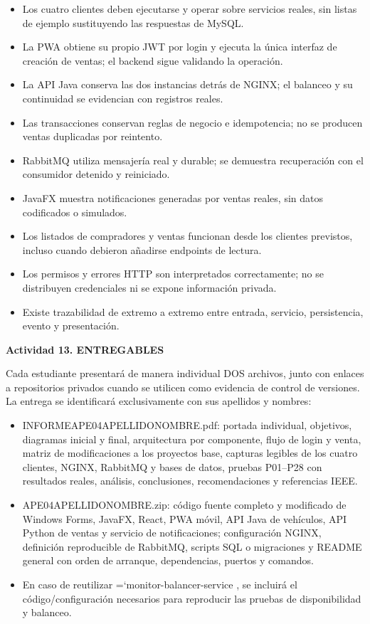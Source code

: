\documentclass[11pt,a4paper]{article}
\renewcommand{\_}{\oldunderscore\allowbreak}
\DeclareRobustCommand{\texttt}[1]{%
  {\upshape\ttfamily\fontsize{9}{10.8}\selectfont\hyphenchar\font=`\-\relax #1}%
}
\begin{document}
\begin{itemize}[leftmargin=*,itemsep=2pt,topsep=2pt]
  \item Los cuatro clientes deben ejecutarse y operar sobre servicios reales, sin listas de ejemplo sustituyendo las respuestas de MySQL.
  \item La PWA obtiene su propio JWT por login y ejecuta la única interfaz de creación de ventas; el backend sigue validando la operación.
  \item La API Java conserva las dos instancias detrás de NGINX; el balanceo y su continuidad se evidencian con registros reales.
  \item Las transacciones conservan reglas de negocio e idempotencia; no se producen ventas duplicadas por reintento.
  \item RabbitMQ utiliza mensajería real y durable; se demuestra recuperación con el consumidor detenido y reiniciado.
  \item JavaFX muestra notificaciones generadas por ventas reales, sin datos codificados o simulados.
  \item Los listados de compradores y ventas funcionan desde los clientes previstos, incluso cuando debieron añadirse endpoints de lectura.
  \item Los permisos y errores HTTP son interpretados correctamente; no se distribuyen credenciales ni se expone información privada.
  \item Existe trazabilidad de extremo a extremo entre entrada, servicio, persistencia, evento y presentación.
\end{itemize}

\vspace{0.3cm}

\noindent\textbf{Actividad 13. ENTREGABLES}

\noindent Cada estudiante presentará de manera individual DOS archivos, junto con enlaces a repositorios privados cuando se utilicen como evidencia de control de versiones. La entrega se identificará exclusivamente con sus apellidos y nombres:

\begin{itemize}[leftmargin=*,itemsep=2pt,topsep=2pt]
  \item INFORME\_APE04\_APELLIDO\_NOMBRE.pdf: portada individual, objetivos, diagramas inicial y final, arquitectura por componente, flujo de login y venta, matriz de modificaciones a los proyectos base, capturas legibles de los cuatro clientes, NGINX, RabbitMQ y bases de datos, pruebas P01–P28 con resultados reales, análisis, conclusiones, recomendaciones y referencias IEEE.
  \item APE04\_APELLIDO\_NOMBRE.zip: código fuente completo y modificado de Windows Forms, JavaFX, React, PWA móvil, API Java de vehículos, API Python de ventas y servicio de notificaciones; configuración NGINX, definición reproducible de RabbitMQ, scripts SQL o migraciones y README general con orden de arranque, dependencias, puertos y comandos.
  \item En caso de reutilizar \texttt{monitor-balancer-service}, se incluirá el código/configuración necesarios para reproducir las pruebas de disponibilidad y balanceo.
\end{itemize}
\end{document}
